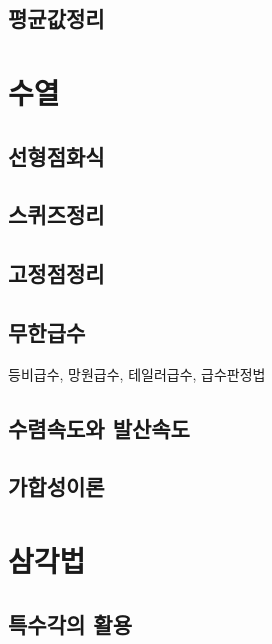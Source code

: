 \documentclass{../prb}
\begin{document}
\section{평균값정리}











\chapter{수열}

\section{선형점화식}

\section{스퀴즈정리}

\section{고정점정리}

\section{무한급수}
등비급수, 망원급수, 테일러급수, 급수판정법

\section{수렴속도와 발산속도}

\section{가합성이론}











\chapter{삼각법}


\section{특수각의 활용}
\end{document}
